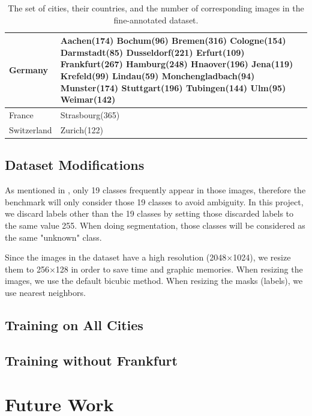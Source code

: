 \documentclass[10pt,twocolumn,letterpaper]{article}
\begin{document}
\begin{table}[h]
\begin{center}
	\begin{tabular}{ | l | p{4.6cm} | }
		\hline
		Germany & Aachen(174) Bochum(96) Bremen(316) Cologne(154)
		Darmstadt(85) Dusseldorf(221) Erfurt(109) Frankfurt(267) Hamburg(248) Hnaover(196) Jena(119) Krefeld(99) Lindau(59) Monchengladbach(94) Munster(174) Stuttgart(196) Tubingen(144) Ulm(95) Weimar(142)\\ \hline
		France & Strasbourg(365)\\ \hline
		Switzerland & Zurich(122)\\
		\hline
	\end{tabular}
\end{center}
\caption{The set of cities, their countries, and the number of corresponding images in the fine-annotated dataset.} \label{tab:table1}
\end{table}

\subsection{Dataset Modifications}
As mentioned in \cite{Cordts2016Cityscapes}, only 19 classes frequently appear in those images, therefore the benchmark will only consider those 19 classes to avoid ambiguity. In this project, we discard labels other than the 19 classes by setting those discarded labels to the same value 255. When doing segmentation, those classes will be considered as the same "unknown" class.

Since the images in the dataset have a high resolution (2048$\times$1024), we resize them to 256$\times$128 in order to save time and graphic memories. When resizing the images, we use the default bicubic method. When resizing the masks (labels), we use nearest neighbors.

\subsection{Training on All Cities}

\subsection{Training without Frankfurt}

\section{Future Work}
\end{document}
